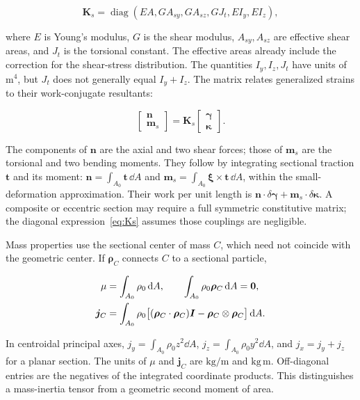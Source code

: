 \begin{equation}
\bm K_s=\operatorname{diag}(EA,GA_{sy},GA_{sz},GJ_t,EI_y,EI_z),
\label{eq:Ks}
\end{equation}

where $E$ is Young's modulus, $G$ is the shear modulus, $A_{sy},A_{sz}$ are effective shear areas, and $J_t$ is the torsional constant. The effective areas already include the correction for the shear-stress distribution. The quantities $I_y,I_z,J_t$ have units of $\mathrm{m^4}$, but $J_t$ does not generally equal $I_y+I_z$. The matrix relates generalized strains to their work-conjugate resultants:

\begin{equation}
\begin{bmatrix}\bm n\\\bm m_s\end{bmatrix}
=\bm K_s\begin{bmatrix}\bm\gamma\\\bm\kappa\end{bmatrix}.
\label{eq:constitutiva}
\end{equation}

The components of $\bm n$ are the axial and two shear forces; those of $\bm m_s$ are the torsional and two bending moments. They follow by integrating sectional traction $\bm t$ and its moment: $\bm n=\int_{A_0}\bm t\,\dd A$ and $\bm m_s=\int_{A_0}\bm\xi\times\bm t\,\dd A$, within the small-deformation approximation. Their work per unit length is $\bm n\cdot\delta\bm\gamma+\bm m_s\cdot\delta\bm\kappa$. A composite or eccentric section may require a full symmetric constitutive matrix; the diagonal expression~\eqref{eq:Ks} assumes those couplings are negligible.

Mass properties use the sectional center of mass $C$, which need not coincide with the geometric center. If $\bm\rho_C$ connects $C$ to a sectional particle,

\begin{align}
\mu&=\int_{A_0}\rho_0\,\mathrm d A,\qquad
\int_{A_0}\rho_0\bm\rho_C\,\mathrm d A=\bm0,\nonumber\\
\bm j_C&=\int_{A_0}\rho_0
\big[(\bm\rho_C\cdot\bm\rho_C)\bm I-\bm\rho_C\otimes\bm\rho_C\big]\,\mathrm d A.
\label{eq:sectioninertia}
\end{align}

In centroidal principal axes, $j_y=\int_{A_0}\rho_0 z^2\dd A$, $j_z=\int_{A_0}\rho_0 y^2\dd A$, and $j_x=j_y+j_z$ for a planar section. The units of $\mu$ and $\bm j_C$ are $\mathrm{kg/m}$ and $\mathrm{kg\,m}$. Off-diagonal entries are the negatives of the integrated coordinate products. This distinguishes a mass-inertia tensor from a geometric second moment of area.

